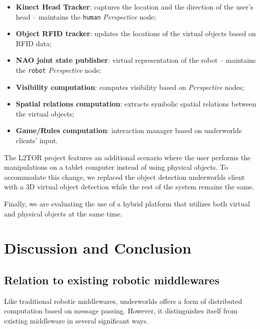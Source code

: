 \documentclass[letterpaper, 10 pt, conference]{ieeeconf}  %
\newcommand{\uwds}{{\sc underworlds}\xspace}
\begin{document}
\begin{itemize}
    \item \textbf{Kinect Head Tracker}: captures the location and the direction
        of the user's head -- maintains the {\tt human} \emph{Perspective} node;

    \item \textbf{Object RFID tracker}: updates the locations of the virtual
        objects based on RFID data;

    \item \textbf{NAO joint state publisher}: virtual representation of the
        robot -- maintains the {\tt robot} \emph{Perspective} node;

    \item \textbf{Visibility computation}: computes visibility based on
        \emph{Perspective} nodes;

    \item \textbf{Spatial relations computation}: extracts symbolic spatial relations
        between the virtual objects;

    \item \textbf{Game/Rules computation}: interaction manager based on \uwds
        clients' input.

\end{itemize}

The L2TOR project features an additional scenario where the user performs the
manipulations on a tablet computer instead of using physical objects. To
accommodate this change, we replaced the object detection \uwds client with a 3D
virtual object detection while the rest of the system remains the same.

Finally, we are evaluating the use of a hybrid platform that utilizes both virtual and
physical objects at the same time. 


\section{Discussion and Conclusion}

\subsection{Relation to existing robotic middlewares}

Like traditional robotic middlewares, \uwds offers a form of distributed
computation based on message passing. However, it distinguishes itself from
existing middleware in several significant ways.
\end{document}
